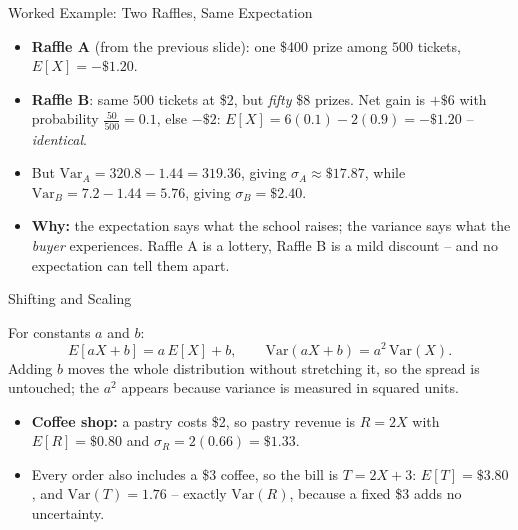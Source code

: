 \begin{frame}{Worked Example: Two Raffles, Same Expectation}
\begin{itemize}
  \item \textbf{Raffle A} (from the previous slide): one \$400 prize among $500$ tickets, $E[X] = -\$1.20$.
  \pause
  \item \textbf{Raffle B}: same $500$ tickets at \$2, but \emph{fifty} \$8 prizes. Net gain is $+\$6$ with probability $\tfrac{50}{500} = 0.1$, else $-\$2$:
  $E[X] = 6(0.1) - 2(0.9) = -\$1.20$ -- \emph{identical}.
  \pause
  \item But $\mathrm{Var}_A = 320.8 - 1.44 = 319.36$, giving $\sigma_A \approx \$17.87$, while $\mathrm{Var}_B = 7.2 - 1.44 = 5.76$, giving $\sigma_B = \$2.40$.
  \pause
  \item \textbf{Why:} the expectation says what the school raises; the variance says what the \emph{buyer} experiences. Raffle A is a lottery, Raffle B is a mild discount -- and no expectation can tell them apart.
\end{itemize}
\end{frame}

\begin{frame}{Shifting and Scaling}
\begin{rldefinition}
For constants $a$ and $b$:
\[
E[aX + b] = a\,E[X] + b ,
\qquad
\mathrm{Var}(aX + b) = a^2\,\mathrm{Var}(X) .
\]
Adding $b$ moves the whole distribution without stretching it, so the spread is untouched; the $a^2$ appears because variance is measured in squared units.
\end{rldefinition}
\pause
\begin{itemize}
  \item \textbf{Coffee shop:} a pastry costs \$2, so pastry revenue is $R = 2X$ with $E[R] = \$0.80$ and $\sigma_R = 2(0.66) = \$1.33$.
  \pause
  \item Every order also includes a \$3 coffee, so the bill is $T = 2X + 3$: $E[T] = \$3.80$, and $\mathrm{Var}(T) = 1.76$ -- exactly $\mathrm{Var}(R)$, because a fixed \$3 adds no uncertainty.
\end{itemize}
\end{frame}

